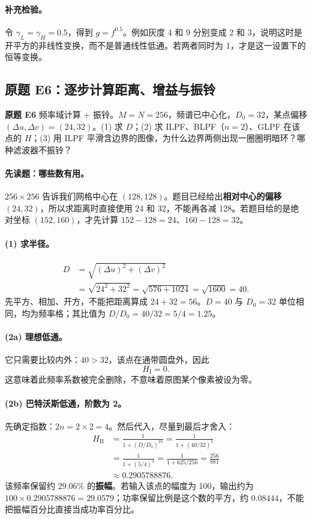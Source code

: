 \paragraph{补充检验。}
令 $\gamma_L=\gamma_H=0.5$，得到 $g=f^{0.5}$。例如灰度 4 和 9 分别变成 2 和 3，说明这时是开平方的非线性变换，而不是普通线性低通。若两者同时为 1，才是这一设置下的恒等变换。

\subsection{原题 E6：逐步计算距离、增益与振铃}
\label{original:E6}

\noindent\textbf{原题 E6}\quad
频率域计算 + 振铃。$M=N=256$，频谱已中心化，$D_0=32$，某点偏移 $(\Delta u,\Delta v)=(24,32)$。(1) 求 $D$；(2) 求 ILPF、BLPF（$n=2$）、GLPF 在该点的 $H$；(3) 用 ILPF 平滑含边界的图像，为什么边界两侧出现一圈圈明暗环？哪种滤波器不振铃？

\paragraph{先读题：哪些数有用。}
$256\times256$ 告诉我们网格中心在 $(128,128)$。题目已经给出\textbf{相对中心的偏移} $(24,32)$，所以求距离时直接使用 24 和 32，不能再各减 128。若题目给的是绝对坐标 $(152,160)$，才先计算 $152-128=24$、$160-128=32$。

\paragraph{(1) 求半径。}
\[
\begin{aligned}
D&=\sqrt{(\Delta u)^2+(\Delta v)^2}\\
 &=\sqrt{24^2+32^2}=\sqrt{576+1024}
 =\sqrt{1600}=40.
\end{aligned}
\]
先平方、相加、开方，不能把距离算成 $24+32=56$。$D=40$ 与 $D_0=32$ 单位相同，均为频率格；其比值为 $D/D_0=40/32=5/4=1.25$。

\paragraph{(2a) 理想低通。}
它只需要比较内外：$40>32$，该点在通带圆盘外，因此
\[
\boxed{H_{\mathrm I}=0}.
\]
这意味着此频率系数被完全删除，不意味着原图某个像素被设为零。

\paragraph{(2b) 巴特沃斯低通，阶数为 2。}
先确定指数：$2n=2\times2=4$。然后代入，尽量到最后才舍入：
\[
\begin{aligned}
H_{\mathrm B}
&=\frac{1}{1+(D/D_0)^{2n}}
=\frac{1}{1+(40/32)^4}\\
&=\frac{1}{1+(5/4)^4}
=\frac{1}{1+625/256}
=\frac{256}{881}\\
&\approx\boxed{0.2905788876}.
\end{aligned}
\]
该频率保留约 $29.06\%$ 的\textbf{振幅}。若输入该点的幅度为 100，输出约为 $100\times0.2905788876=29.0579$；功率保留比例是这个数的平方，约 $0.08444$，不能把振幅百分比直接当成功率百分比。

